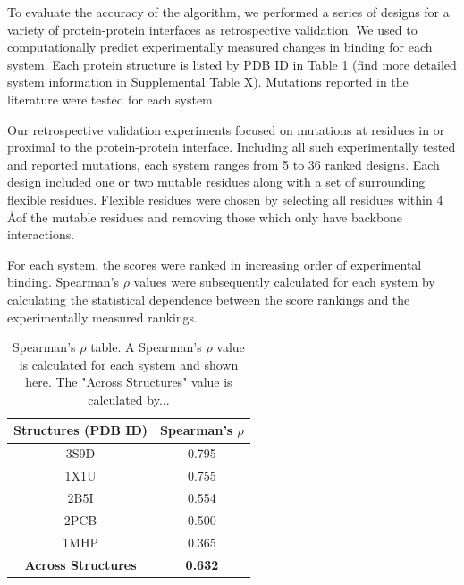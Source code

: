 To evaluate the accuracy of the \osprey \ks algorithm, we performed a series of designs for a variety of protein-protein interfaces as retrospective validation. We used \ks to computationally predict experimentally measured changes in binding for each system. Each protein structure is listed by PDB ID in Table \ref{table:spearman} (find more detailed system information in Supplemental Table X). Mutations reported in the literature were tested for each system 


Our retrospective validation experiments focused on mutations at residues in or proximal to the protein-protein interface. Including all such experimentally tested and reported mutations, each system ranges from 5 to 36 ranked designs. Each design included one or two mutable residues along with a set of surrounding flexible residues. Flexible residues were chosen by selecting all residues within 4 \AA of the mutable residues and removing those which only have backbone interactions. 

For each system, the \ks scores were ranked in increasing order of experimental binding. Spearman's $\rho$ values were subsequently calculated for each system by calculating the statistical dependence between the \ks score rankings and the experimentally measured rankings. 

\begin{table}[h!]\label{table:spearman}
\centering
\begin{tabular}{ |c||c|  }
 \hline
 \textbf{Structures (PDB ID)}& \textbf{Spearman's $\rho$} \\
 \hline 
 3S9D   & 0.795 \\
 \hline
 1X1U   & 0.755 \\
 \hline
 2B5I   & 0.554 \\
 \hline
 2PCB   & 0.500 \\
 \hline
 1MHP   & 0.365 \\
 \hline 
 \textbf{Across Structures} &   \textbf{0.632}  \\
 \hline
\end{tabular}
\caption{Spearman's $\rho$ table. A Spearman's $\rho$ value is calculated for each system and shown here. The "Across Structures" value is calculated by... }
\end{table}

